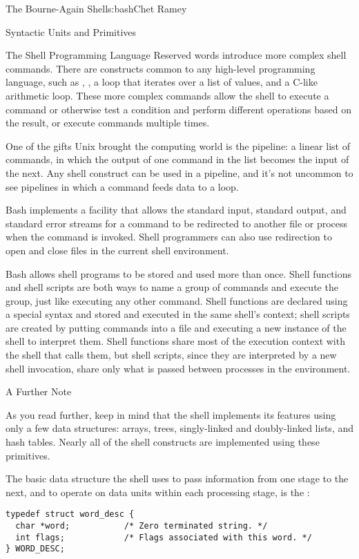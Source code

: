 \begin{aosachapter}{The Bourne-Again Shell}{s:bash}{Chet Ramey}
\begin{aosasect1}{Syntactic Units and Primitives}
\begin{aosasect2}{The Shell Programming Language}
Reserved words introduce more complex shell commands.  There are
constructs common to any high-level programming language, such as
, , a  loop that iterates
over a list of values, and a C-like arithmetic  loop.
These more complex commands allow the shell to execute a
command or otherwise test a condition and perform different operations
based on the result, or execute commands multiple times.

One of the gifts Unix brought the computing world is the pipeline: a
linear list of commands, in which the output of one command in the
list becomes the input of the next.  Any shell construct can be used
in a pipeline, and it's not uncommon to see pipelines in which a
command feeds data to a loop.

Bash implements a facility that allows the standard input, standard
output, and standard error streams for a command to be redirected to
another file or process when the command is invoked.  Shell
programmers can also use redirection to open and close files in the
current shell environment.

Bash allows shell programs to be stored and used more than once.
Shell functions and shell scripts are both ways to name a group of
commands and execute the group, just like executing any other command.
Shell functions are declared using a special syntax and stored and
executed in the same shell's context; shell scripts are created by
putting commands into a file and executing a new instance of the shell
to interpret them.  Shell functions share most of the execution
context with the shell that calls them, but shell scripts, since they
are interpreted by a new shell invocation, share only what is passed
between processes in the environment.

\end{aosasect2}

\begin{aosasect2}{A Further Note}

As you read further, keep in mind that the shell implements its
features using only a few data structures: arrays, trees,
singly-linked and doubly-linked lists, and hash tables.  Nearly all of
the shell constructs are implemented using these primitives.

The basic data structure the shell uses to pass information from one
stage to the next, and to operate on data units within each processing
stage, is the :

\begin{verbatim}
typedef struct word_desc {
  char *word;           /* Zero terminated string. */
  int flags;            /* Flags associated with this word. */
} WORD_DESC;
\end{verbatim}


\end{aosasect2}
\end{aosasect1}
\end{aosachapter}
